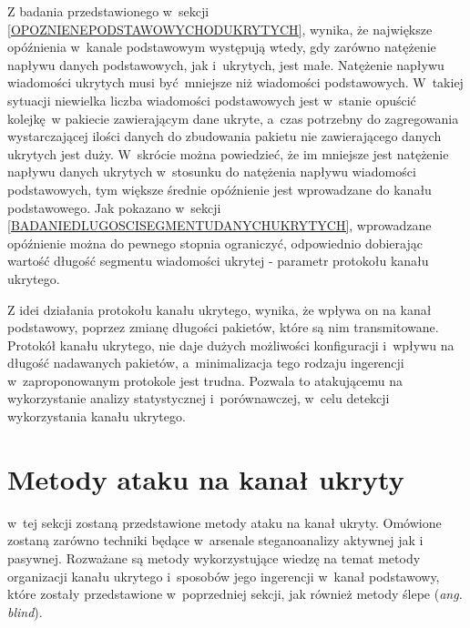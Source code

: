 \documentclass[a4paper, twoside, 12pt]{report}
\begin{document}
        Z badania przedstawionego w~sekcji \ref{OPOZNIENEPODSTAWOWYCHODUKRYTYCH},
        wynika, że największe opóźnienia w~kanale podstawowym
        występują wtedy, gdy zarówno natężenie napływu danych podstawowych, jak i~ukrytych, jest małe.
        Natężenie napływu wiadomości ukrytych musi być mniejsze niż wiadomości podstawowych.
        W~takiej sytuacji niewielka liczba wiadomości podstawowych jest w~stanie
        opuścić kolejkę w pakiecie zawierającym dane ukryte, a~czas potrzebny do
        zagregowania wystarczającej ilości danych do zbudowania pakietu nie
        zawierającego danych ukrytych jest duży. W~skrócie można powiedzieć, że
        im mniejsze jest natężenie napływu danych ukrytych w~stosunku do natężenia
        napływu wiadomości podstawowych, tym większe średnie opóźnienie jest wprowadzane
        do kanału podstawowego. Jak pokazano w~sekcji \ref{BADANIEDLUGOSCISEGMENTUDANYCHUKRYTYCH},
        wprowadzane opóźnienie można do pewnego stopnia ograniczyć, odpowiednio
        dobierając wartość długość segmentu wiadomości ukrytej - parametr protokołu
        kanału ukrytego.

        Z idei działania protokołu kanału ukrytego, wynika, że wpływa on na kanał
        podstawowy, poprzez zmianę długości pakietów, które są nim transmitowane.
        Protokół kanału ukrytego, nie daje dużych możliwości konfiguracji i~wpływu
        na długość nadawanych pakietów, a~minimalizacja tego rodzaju ingerencji
        w~zaproponowanym protokole jest trudna. Pozwala to atakującemu
        na wykorzystanie analizy statystycznej i~porównawczej, w~celu detekcji
        wykorzystania kanału ukrytego.

    \section{Metody ataku na kanał ukryty}
       w~tej sekcji zostaną przedstawione metody ataku na kanał ukryty. Omówione
       zostaną zarówno techniki będące w~arsenale steganoanalizy aktywnej jak i
       pasywnej. Rozważane są metody wykorzystujące wiedzę na temat metody organizacji kanału ukrytego
       i~sposobów jego ingerencji w~kanał podstawowy, które zostały przedstawione w~poprzedniej sekcji,
       jak również metody ślepe (\emph{ang. blind}).
\end{document}
